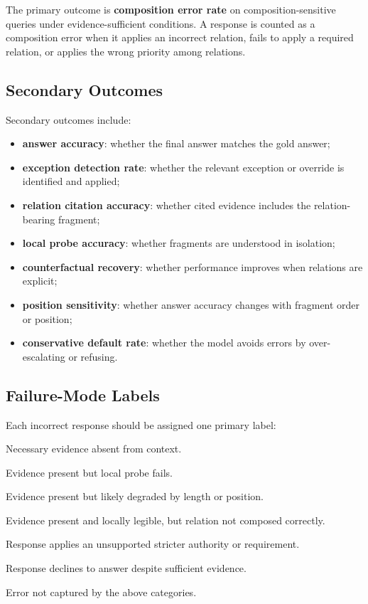 \documentclass[11pt]{article}
\begin{document}
The primary outcome is \textbf{composition error rate} on composition-sensitive queries under evidence-sufficient conditions. A response is counted as a composition error when it applies an incorrect relation, fails to apply a required relation, or applies the wrong priority among relations.

\subsection{Secondary Outcomes}

Secondary outcomes include:

\begin{itemize}[leftmargin=*,itemsep=2pt]
    \item \textbf{answer accuracy}: whether the final answer matches the gold answer;
    \item \textbf{exception detection rate}: whether the relevant exception or override is identified and applied;
    \item \textbf{relation citation accuracy}: whether cited evidence includes the relation-bearing fragment;
    \item \textbf{local probe accuracy}: whether fragments are understood in isolation;
    \item \textbf{counterfactual recovery}: whether performance improves when relations are explicit;
    \item \textbf{position sensitivity}: whether answer accuracy changes with fragment order or position;
    \item \textbf{conservative default rate}: whether the model avoids errors by over-escalating or refusing.
\end{itemize}

\subsection{Failure-Mode Labels}

Each incorrect response should be assigned one primary label:

\begin{description}[style=nextline,leftmargin=1em,itemsep=2pt]
    \item[Retrieval failure.] Necessary evidence absent from context.
    \item[Local comprehension failure.] Evidence present but local probe fails.
    \item[Contextual failure.] Evidence present but likely degraded by length or position.
    \item[Composition hallucination.] Evidence present and locally legible, but relation not composed correctly.
    \item[Wrong escalation.] Response applies an unsupported stricter authority or requirement.
    \item[Refusal / non-answer.] Response declines to answer despite sufficient evidence.
    \item[Other.] Error not captured by the above categories.
\end{description}
\end{document}

